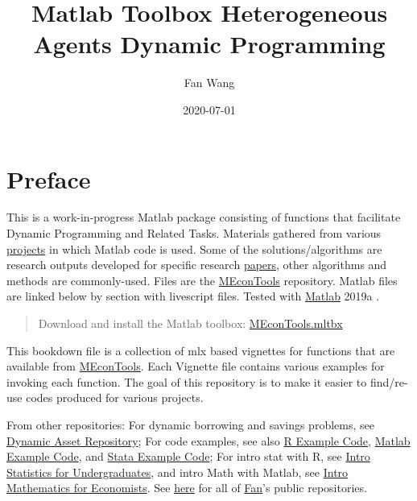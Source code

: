 \documentclass[
]{book}
\title{Matlab Toolbox Heterogeneous Agents Dynamic Programming}
\author{Fan Wang}
\date{2020-07-01}
\begin{document}
\maketitle

{
\hypersetup{linkcolor=}
\setcounter{tocdepth}{1}
\tableofcontents
}
\hypertarget{preface}{%
\chapter*{Preface}\label{preface}}

This is a work-in-progress Matlab package consisting of functions that facilitate Dynamic Programming and Related Tasks. Materials gathered from various \href{https://fanwangecon.github.io/research}{projects} in which Matlab code is used. Some of the solutions/algorithms are research outputs developed for specific research \href{https://fanwangecon.github.io/research}{papers}, other algorithms and methods are commonly-used. Files are the \href{https://github.com/FanWangEcon/MEconTools}{MEconTools} repository. Matlab files are linked below by section with livescript files. Tested with \href{https://www.mathworks.com/products/matlab.html}{Matlab} 2019a \citep{matlab}.

\begin{quote}
Download and install the Matlab toolbox: \href{https://github.com/FanWangEcon/MEconTools/blob/master/MEconTools.mltbx}{MEconTools.mltbx}
\end{quote}

This bookdown file is a collection of mlx based vignettes for functions that are available from \href{https://github.com/FanWangEcon/MEconTools}{MEconTools}. Each Vignette file contains various examples for invoking each function. The goal of this repository is to make it easier to find/re-use codes produced for various projects.

From other repositories: For dynamic borrowing and savings problems, see \href{https://fanwangecon.github.io/CodeDynaAsset/}{Dynamic Asset Repository}; For code examples, see also \href{https://fanwangecon.github.io/R4Econ/}{R Example Code}, \href{https://fanwangecon.github.io/M4Econ/}{Matlab Example Code}, and \href{https://fanwangecon.github.io/Stata4Econ/}{Stata Example Code}; For intro stat with R, see \href{https://fanwangecon.github.io/Stat4Econ/}{Intro Statistics for Undergraduates}, and intro Math with Matlab, see \href{https://fanwangecon.github.io/Math4Econ/}{Intro Mathematics for Economists}. See \href{https://github.com/FanWangEcon}{here} for all of \href{https://fanwangecon.github.io/}{Fan}'s public repositories.
\end{document}
